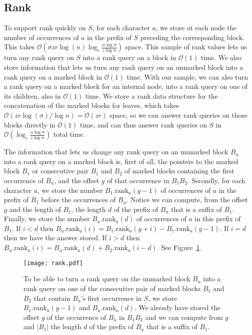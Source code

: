 \documentclass[12pt]{article}
\newcommand{\Oh}[1]
  {\ensuremath{\mathcal{O}\!\left({#1}\right)}}
\newcommand{\rank}
  {\ensuremath{\mathrm{rank}}}
\begin{document}
\subsection{Rank}
\label{subsec:rank}

To support rank quickly on $S$, for each character $a$, we store at each node the number of occurrences of $a$ in the prefix of $S$ preceding the corresponding block.  This takes $\Oh{\sigma z r \log (n) \log_r \frac{n\log\sigma}{z\log n}}$ space.  This sample of rank values lets us turn any rank query on $S$ into a rank query on a block in $\Oh{1}$ time.  We also store information that lets us turn any rank query on an unmarked block into a rank query on a marked block in $\Oh{1}$ time.  With our sample, we can also turn a rank query on a marked block for an internal node, into a rank query on one of its children, also in $\Oh{1}$ time.  We store a rank data structure for the concatenation of the marked blocks for leaves, which takes \(\Oh{z r \log (\sigma) / \log n} = \Oh{z r}\) space, so we can answer rank queries on those blocks directly in $\Oh{1}$ time, and can thus answer rank queries on $S$ in $\Oh{\log_r \frac{n\log\sigma}{z\log n}}$ total time.

The information that lets us change any rank query on an unmarked block $B_u$ into a rank query on a marked block is, first of all, the pointers to the marked block $B_1$ or consecutive pair $B_1$ and $B_2$ of marked blocks containing the first occurrence of $B_u$, and the offset $g$ of that occurrence in \(B_1 B_2\).  Secondly, for each character $a$, we store the number \(B_1.\rank_a (g - 1)\) of occurrences of $a$ in the prefix of $B_1$ before the occurrences of $B_u$.  Notice we can compute, from the offset $g$ and the length of $B_1$, the length $d$ of the prefix of $B_u$ that is a suffix of $B_1$.  Finally, we store the number \(B_u.\rank_a (d)\) of occurrences of $a$ in this prefix of $B_1$.  If \(i < d\) then \(B_u.\rank_a (i) = B_1.\rank_a (g + i) - B_1.\rank_a (g - 1)\).  If \(i = d\) then we have the answer stored.  If \(i > d\) then \(B_u.\rank_a (i) = B_u.\rank_a (d) + B_2.\rank_a (i - d)\).  See Figure~\ref{fig:rank}.

\begin{figure}[t]
\begin{center}
\texttt{[image: rank.pdf]}
\caption{To be able to turn a rank query on the unmarked block $B_u$ into a rank query on one of the consecutive pair of marked blocks $B_1$ and $B_2$ that contain $B_u$'s first occurrence in $S$, we store \(B_1.\rank_a (g - 1)\) and \(B_u.\rank_a (d)\).  We already have stored the offset $g$ of the occurrence of $B_u$ in \(B_1 B_2\) and we can compute from $g$ and $|B_1|$ the length $d$ of the prefix of $B_u$ that is a suffix of $B_1$.}
\label{fig:rank}
\end{center}
\end{figure}
\end{document}
